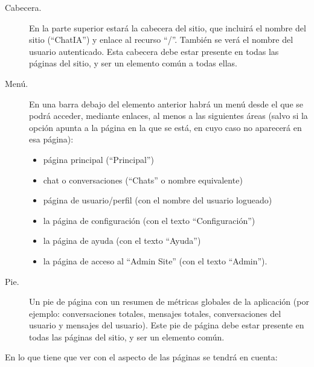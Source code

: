 \begin{description}
\item[Cabecera.] En la parte superior estará la cabecera del sitio, que incluirá el nombre del sitio (``ChatIA'') y enlace al recurso ``/''. También se verá el nombre del usuario autenticado. Esta cabecera debe estar presente en todas las páginas del sitio, y ser un elemento común a todas ellas.

\item[Menú.] En una barra debajo del elemento anterior habrá un menú desde el que se podrá acceder, mediante enlaces, al menos a las siguientes áreas (salvo si la opción apunta a la página en la que se está, en cuyo caso no aparecerá en esa página):
  \begin{itemize}
  \item página principal (``Principal'')
  \item chat o conversaciones (``Chats'' o nombre equivalente)
  \item página de usuario/perfil (con el nombre del usuario logueado)
  \item la página de configuración (con el texto ``Configuración'')
  \item la página de ayuda (con el texto ``Ayuda'')
  \item la página de acceso al ``Admin Site'' (con el texto ``Admin''). 
  \end{itemize}

\item[Pie.] Un pie de página con un resumen de métricas globales de la aplicación (por ejemplo: conversaciones totales, mensajes totales, conversaciones del usuario y mensajes del usuario). Este pie de página debe estar presente en todas las páginas del sitio, y ser un elemento común.
\end{description}
  
En lo que tiene que ver con el aspecto de las páginas se tendrá en cuenta:

